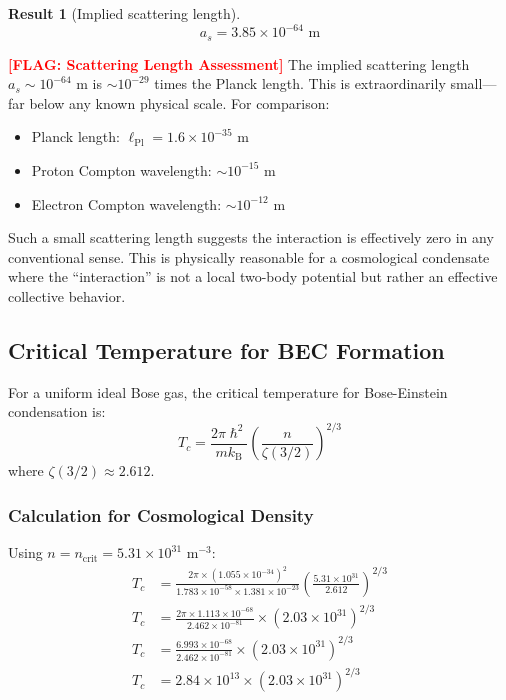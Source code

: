 \documentclass[11pt,a4paper]{article}
\newcommand{\ee}[1]{\times 10^{#1}}
\newcommand{\hbar}{\ensuremath{\hslash}}
\newcommand{\kB}{\ensuremath{k_{\mathrm{B}}}}
\newcommand{\lPl}{\ensuremath{\ell_{\mathrm{Pl}}}}
\newcommand{\FLAG}[1]{\textcolor{red}{\textbf{[FLAG: #1]}}}
\newtheorem{result}{Result}
\begin{document}
\begin{result}[Implied scattering length]
\begin{equation}
\boxed{a_s = 3.85 \times 10^{-64} \text{ m}}
\end{equation}
\end{result}

\FLAG{Scattering Length Assessment} The implied scattering length $a_s \sim 10^{-64}$ m is $\sim 10^{-29}$ times the Planck length. This is extraordinarily small---far below any known physical scale. For comparison:
\begin{itemize}
    \item Planck length: $\lPl = 1.6 \ee{-35}$ m
    \item Proton Compton wavelength: $\sim 10^{-15}$ m
    \item Electron Compton wavelength: $\sim 10^{-12}$ m
\end{itemize}

Such a small scattering length suggests the interaction is effectively zero in any conventional sense. This is physically reasonable for a cosmological condensate where the ``interaction'' is not a local two-body potential but rather an effective collective behavior.

\subsection{Critical Temperature for BEC Formation}
\label{sec:Tc}

For a uniform ideal Bose gas, the critical temperature for Bose-Einstein condensation is:
\begin{equation}
T_c = \frac{2\pi\hbar^2}{m\kB} \left(\frac{n}{\zeta(3/2)}\right)^{2/3}
\end{equation}
where $\zeta(3/2) \approx 2.612$.

\subsubsection{Calculation for Cosmological Density}

Using $n = n_{\mathrm{crit}} = 5.31 \ee{31}$ m$^{-3}$:
\begin{align}
T_c &= \frac{2\pi \times (1.055 \ee{-34})^2}{1.783 \ee{-58} \times 1.381 \ee{-23}} \left(\frac{5.31 \ee{31}}{2.612}\right)^{2/3} \nonumber \\
T_c &= \frac{2\pi \times 1.113 \ee{-68}}{2.462 \ee{-81}} \times (2.03 \ee{31})^{2/3} \nonumber \\
T_c &= \frac{6.993 \ee{-68}}{2.462 \ee{-81}} \times (2.03 \ee{31})^{2/3} \nonumber \\
T_c &= 2.84 \ee{13} \times (2.03 \ee{31})^{2/3}
\end{align}
\end{document}
